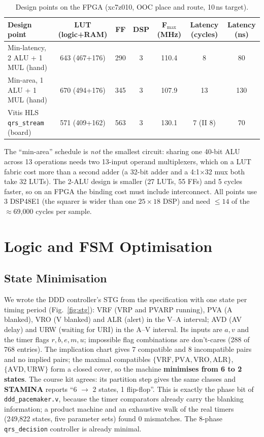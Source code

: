 \documentclass[11pt,a4paper]{article}
\begin{document}
\begin{table}[!tbp]\centering\footnotesize\setlength{\tabcolsep}{3.5pt}
\caption{Design points on the FPGA (xc7z010, OOC place and route, 10\,ns target).}\label{tab:designpoints}
\begin{tabular}{@{}lcccccc@{}}
\toprule
Design point & LUT (logic+RAM) & FF & DSP & F$_\text{max}$ (MHz) & Latency (cycles) & Latency (ns)\\
\midrule
Min-latency, 2 ALU + 1 MUL (hand) & 643 (467+176) & 290 & 3 & 110.4 & 8 & 80\\
Min-area, 1 ALU + 1 MUL (hand)    & 670 (494+176) & 345 & 3 & 107.9 & 13 & 130\\
Vitis HLS \texttt{qrs\_stream} (board) & 571 (409+162) & 563 & 3 & 130.1 & 7 (II 8) & 70\\
\bottomrule
\end{tabular}
\end{table}

The ``min-area'' schedule is \emph{not} the smallest circuit: sharing one 40-bit ALU across 13
operations needs two 13-input operand multiplexers, which on a LUT fabric cost more than a second
adder (a 32-bit adder and a 4:1$\times$32 mux both take 32 LUTs). The 2-ALU design is smaller (27
LUTs, 55 FFs) and 5 cycles faster, so on an FPGA the binding cost must include interconnect. All
points use 3 DSP48E1 (the squarer is wider than one $25\times18$ DSP) and need $\le14$ of the
$\approx$69{,}000 cycles per sample.

\section{Logic and FSM Optimisation}
\label{sec:logic}
\subsection{State Minimisation}
We wrote the DDD controller's STG from the specification with one state per timing period
(Fig.~\ref{fig:stg}): VRF (VRP and PVARP running), PVA (A blanked), VRO (V blanked) and ALR (alert)
in the V--A interval; AVD (AV delay) and URW (waiting for URI) in the A--V interval. Its inputs are
$a, v$ and the timer flags $r, b, e, m, u$; impossible flag combinations are don't-cares (288 of 768
entries). The implication chart gives 7 compatible and 8 incompatible pairs and no implied pairs; the
maximal compatibles $\{\mathrm{VRF,PVA,VRO,ALR}\}$, $\{\mathrm{AVD,URW}\}$ form a closed cover, so
the machine \textbf{minimises from 6 to 2 states}. The course kit agrees: its partition step gives
the same classes and \textbf{STAMINA} reports ``6 $\rightarrow$ 2 states, 1 flip-flop''. This is
exactly the phase bit of \texttt{ddd\_pacemaker.v}, because the timer comparators already carry the
blanking information; a product machine and an exhaustive walk of the real timers (249{,}822 states,
five parameter sets) found 0 mismatches. The 8-phase \texttt{qrs\_decision} controller is already
minimal.
\end{document}
